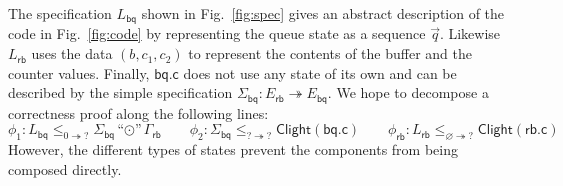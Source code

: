 \documentclass[acmsmall,screen,review,nonacm]{acmart}
\newcommand{\kw}[1]{\ensuremath{ \mathsf{#1} }}
\newcommand{\emptysig}{0}
\begin{document}
\begin{example} \label{ex:abspec} %
The specification $L_\kw{bq}$ shown in Fig.~\ref{fig:spec}
gives an abstract description of the code in Fig.~\ref{fig:code}
by representing the queue state as a sequence $\vec{q}$.
Likewise $L_\kw{rb}$ uses the data $(b, c_1, c_2)$
to represent the contents of the buffer and the counter values.
Finally,
$\kw{bq.c}$ does not use any state of its own
and can be described by the simple 
specification
$
  \Sigma_\kw{bq} : E_\kw{rb} \twoheadrightarrow E_\kw{bq}
$.
%
We hope to decompose a correctness proof
along the following lines:
\[
    \phi_1 : L_\kw{bq}
      \le_{\emptysig \twoheadrightarrow ?}
      \Sigma_\kw{bq} \! \mathbin{\text{``}{\odot}\text{''}} \Gamma_\kw{rb}
    \qquad
    \phi_2 : \Sigma_\kw{bq}
      \le_{? \twoheadrightarrow ?}
      \kw{Clight}(\kw{bq.c})
    \qquad
    \phi_\kw{rb} : L_\kw{rb}
      \le_{\varnothing \twoheadrightarrow ?}
      \kw{Clight}(\kw{rb.c})
\]
However, the different types of states
prevent the components
from being composed directly.
\end{example}
\end{document}
